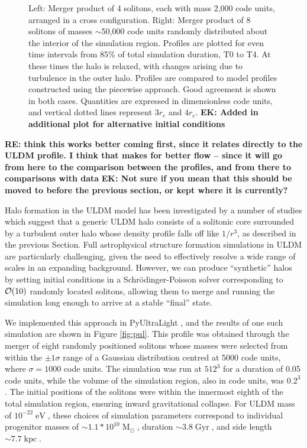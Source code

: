 \documentclass[a4paper,11pt]{article}
\newcommand{\ek}[1]{{{\bf \color{red} EK: #1}}}
\newcommand{\re}[1]{{{\bf \color{green} RE: #1}}}
\begin{document}
\begin{figure}
\begin{tabular}{cc}
\end{tabular}
\caption{Left: Merger product of 4 solitons, each with mass 2,000 code units, arranged in a cross configuration. Right: Merger product of 8 solitons of masses $\sim$50,000 code units randomly distributed about the interior of the simulation region. Profiles are plotted for even time intervals from 85\% of total simulation duration, T0 to T4. At these times the halo is relaxed, with changes arising due to turbulence in the outer halo. Profiles are compared to model profiles constructed using the piecewise approach. Good agreement is shown in both cases. Quantities are expressed in dimensionless code units, and vertical dotted lines represent $3r_c$ and $4r_c$. \ek{Added in additional plot for alternative initial conditions}}\label{fig:validity}
\end{figure}


\re{think this works better coming first, since it relates directly to the ULDM profile. I think that makes for better flow -- since it will go from here to the comparison between the profiles, and from there to comparisons with data}
\ek{Not sure if you mean that this should be  moved to before the previous section, or kept where it is currently?}

Halo formation in the ULDM model has been investigated by a number of studies \cite{Schwabe:2016rze, Mocz:2017wlg, Lin:2018whl} which suggest that a generic ULDM halo consists of a solitonic core surrounded by a turbulent outer halo whose density profile falls off like $1/r^3$, as described in the previous Section. Full astrophysical structure formation simulations in ULDM are particularly challenging, given the need to effectively resolve a wide range of scales in an expanding background. However, we can produce ``synthetic'' halos by setting initial conditions in a Schr{\"o}dinger-Poisson  solver corresponding to ${\cal{O}}(10)$ randomly located solitons, allowing them to merge and running the simulation long enough to arrive at a stable ``final'' state. 

We  implemented this approach in {\sc PyUltraLight}  \cite{Edwards:2018ccc}, and the results of one such simulation are shown in Figure \ref{fig:pul}. This profile was obtained through the merger of eight randomly positioned solitons whose masses were selected from within the $\pm 1\sigma$ range of a Gaussian distribution centred at 5000 code units, where $\sigma = 1000$ code units.
The simulation was run at $512^3$ for a duration of 0.05 code units, while the volume of the simulation region, also in code units, was $0.2^3$. The initial positions of the solitons were within the innermost eighth of the total simulation region, ensuring inward gravitational collapse. For ULDM  mass of $10^{-22}\operatorname{eV}$, these choices of simulation parameters correspond to individual progenitor masses of $\sim 1.1*10^{10}\operatorname{M}_{\odot}$, duration $\sim 3.8 \operatorname{Gyr}$, and side length $\sim 7.7 \operatorname{kpc}$. 
\end{document}
